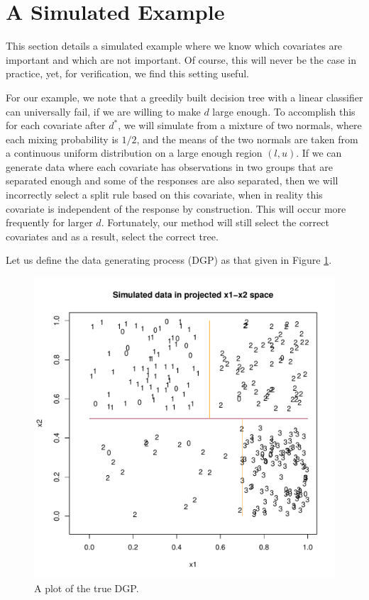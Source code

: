 \section{A Simulated Example}\label{sec:ase}

This section details a simulated example where we know which covariates are important and which are not important. Of course, this will never be the case in practice, yet, for verification, we find this setting useful. 

For our example, we note that a greedily built decision tree with a linear classifier can universally fail, if we are willing to make $d$ large enough. To accomplish this for each covariate after $d^*$, we will simulate from a mixture of two normals, where each mixing probability is $1/2$, and the means of the two normals are taken from a continuous uniform distribution on a large enough region $(l,u)$. If we can generate data where each covariate has observations in two groups that are separated enough and some of the responses are also separated, then we will incorrectly select a split rule based on this covariate, when in reality this covariate is independent of the response by construction. This will occur more frequently for larger $d$. Fortunately, our method will still select the correct covariates and as a result, select the correct tree.   

 Let us define the data generating process (DGP) as that given in Figure \ref{fig:awesome_image2}.  

\begin{figure}[h]
\centering
\label{fig:3fig_tree}
  \includegraphics[scale=0.4]{figures/proj_plot.pdf}
  \caption{A plot of the true DGP.}\label{fig:awesome_image2}
\end{figure}

